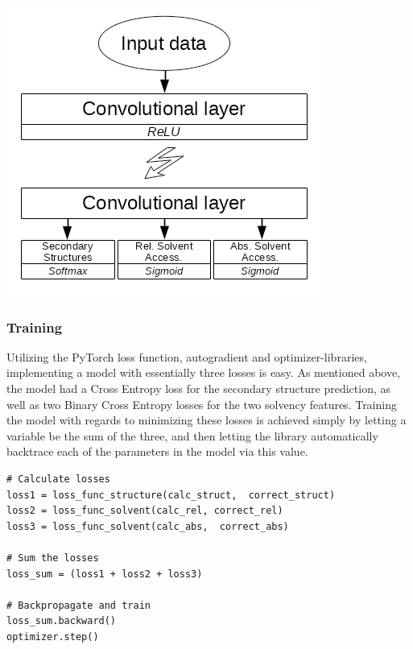 \begin{multicols}{2}
\begin{Figure}
 \centering
 \includegraphics[width=\linewidth]{../graphs/arch}
 \captionsetup{width=0.8\linewidth, font=small}
\end{Figure}

\subsubsection{Training}
Utilizing the PyTorch loss function, autogradient and optimizer-libraries, implementing a model with essentially three losses is easy. As mentioned above, the model had a Cross Entropy loss for the secondary structure prediction, as well as two Binary Cross Entropy losses for the two solvency features. Training the model with regards to minimizing these losses is achieved simply by letting a variable be the sum of the three, and then letting the library automatically backtrace each of the parameters in the model via this value.
\begin{lstlisting}
# Calculate losses
loss1 = loss_func_structure(calc_struct,  correct_struct)
loss2 = loss_func_solvent(calc_rel, correct_rel)
loss3 = loss_func_solvent(calc_abs,  correct_abs)

# Sum the losses
loss_sum = (loss1 + loss2 + loss3)

# Backpropagate and train
loss_sum.backward()
optimizer.step()
\end{lstlisting}



\end{multicols}
